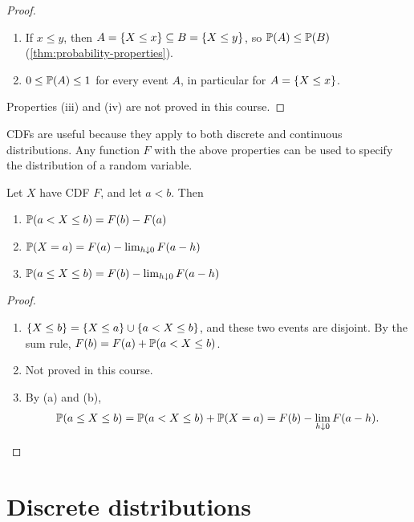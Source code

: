 \begin{proof}\leavevmode
\begin{enumerate}[leftmargin=*]
  \item[(i)] If $x \le y$, then $A = \left\{ X \le x \right\} \subseteq B = \left\{ X \le y \right\}$, so $\mathbb{P}(A) \le \mathbb{P}(B)$ (\cref{thm:probability-properties}).
  \item[(ii)] $0 \le \mathbb{P}(A) \le 1$ for every event $A$, in particular for $A = \left\{ X \le x \right\}$.
\end{enumerate}
Properties (iii) and (iv) are not proved in this course.
\end{proof}

CDFs are useful because they apply to both discrete and continuous distributions. Any function $F$ with the above properties can be used to specify the distribution of a random variable.

\begin{proposition}\label{prop:cdf-interval-probabilities}
Let $X$ have CDF $F$, and let $a < b$. Then
\begin{enumerate}[label=(\alph*)]
  \item $\mathbb{P}(a < X \le b) = F(b) - F(a)$
  \item $\mathbb{P}(X = a) = F(a) - \lim_{h \downarrow 0} F(a - h)$
  \item $\mathbb{P}(a \le X \le b) = F(b) - \lim_{h \downarrow 0} F(a - h)$
\end{enumerate}
\end{proposition}

\begin{proof}\leavevmode
\begin{enumerate}[leftmargin=*]
  \item[(a)] $\left\{ X \le b \right\} = \left\{ X \le a \right\} \cup \left\{ a < X \le b \right\}$, and these two events are disjoint. By the sum rule, $F(b) = F(a) + \mathbb{P}(a < X \le b)$.
  \item[(b)] Not proved in this course.
  \item[(c)] By (a) and (b),
  \[
    \mathbb{P}(a \le X \le b) = \mathbb{P}(a < X \le b) + \mathbb{P}(X = a) = F(b) - \lim_{h \downarrow 0} F(a - h). \qedhere
  \]
\end{enumerate}
\end{proof}

\section{Discrete distributions}\label{sec:discrete-distributions}

